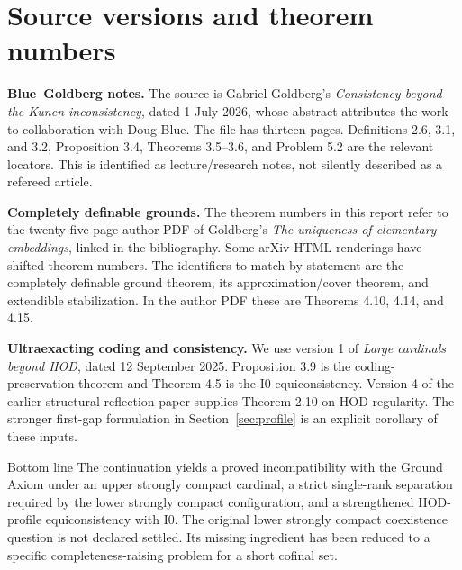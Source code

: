 \documentclass[11pt,letterpaper]{article}
\theoremstyle{definition}
\newcommand{\Izero}{\mathrm{I0}}
\begin{document}
\section{Source versions and theorem numbers}\label{sec:sources}

\textbf{Blue--Goldberg notes.} The source is Gabriel Goldberg's \emph{Consistency beyond the Kunen inconsistency}, dated 1 July 2026, whose abstract attributes the work to collaboration with Doug Blue. The file has thirteen pages. Definitions 2.6, 3.1, and 3.2, Proposition 3.4, Theorems 3.5--3.6, and Problem 5.2 are the relevant locators. This is identified as lecture/research notes, not silently described as a refereed article.

\textbf{Completely definable grounds.} The theorem numbers in this report refer to the twenty-five-page author PDF of Goldberg's \emph{The uniqueness of elementary embeddings}, linked in the bibliography. Some arXiv HTML renderings have shifted theorem numbers. The identifiers to match by statement are the completely definable ground theorem, its approximation/cover theorem, and extendible stabilization. In the author PDF these are Theorems 4.10, 4.14, and 4.15.

\textbf{Ultraexacting coding and consistency.} We use version 1 of \emph{Large cardinals beyond HOD}, dated 12 September 2025. Proposition 3.9 is the coding-preservation theorem and Theorem 4.5 is the $\Izero$ equiconsistency. Version 4 of the earlier structural-reflection paper supplies Theorem 2.10 on HOD regularity. The stronger first-gap formulation in Section~\ref{sec:profile} is an explicit corollary of these inputs.

\begin{assessment}{Bottom line}
The continuation yields a proved incompatibility with the Ground Axiom under an upper strongly compact cardinal, a strict single-rank separation required by the lower strongly compact configuration, and a strengthened HOD-profile equiconsistency with $\Izero$. The original lower strongly compact coexistence question is not declared settled. Its missing ingredient has been reduced to a specific completeness-raising problem for a short cofinal set.
\end{assessment}
\end{document}
